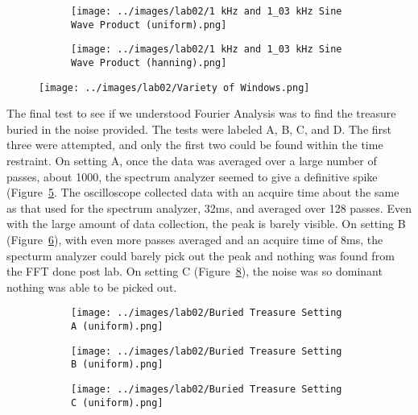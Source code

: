 \documentclass[12pt]{article}
\begin{document}
\begin{figure}[!ht]
    \centering
    \begin{subfigure}[h]{\textwidth}
    \texttt{[image: ../images/lab02/1 kHz and 1\_03 kHz Sine Wave Product (uniform).png]}
    \caption{}
    \label{fig:sine product}
    \end{subfigure}
    \begin{subfigure}[h]{\textwidth}
    \texttt{[image: ../images/lab02/1 kHz and 1\_03 kHz Sine Wave Product (hanning).png]}
    \caption{}
    \label{fig:sine product}
    \end{subfigure}
\end{figure} %

\begin{figure}
\centering
    \texttt{[image: ../images/lab02/Variety of Windows.png]}
    \caption{}
    \label{fig:various windows}
\end{figure} %

The final test to see if we understood Fourier Analysis was to find the treasure buried in the noise provided. The tests were labeled A, B, C, and D. The first three were attempted, and only the first two could be found within the time restraint. On setting A, once the data was averaged over a large number of passes, about 1000, the spectrum analyzer seemed to give a definitive spike (Figure~\ref{fig:buried A}. The oscilloscope collected data with an acquire time about the same as that used for the spectrum analyzer, 32ms, and averaged over 128 passes. Even with the large amount of data collection, the peak is barely visible. On setting B (Figure~\ref{fig:buried B}), with even more passes averaged and an acquire time of 8ms, the specturm analyzer could barely pick out the peak and nothing was found from the FFT done post lab. On setting C (Figure~\ref{fig:buried C}), the noise was so dominant nothing was able to be picked out. 

\begin{figure}[!ht]
    \centering
    \begin{subfigure}[h]{\textwidth}
    \texttt{[image: ../images/lab02/Buried Treasure Setting A (uniform).png]}
    \caption{}
    \label{fig:buried A}
    \end{subfigure}
    \begin{subfigure}[h]{\textwidth}
    \texttt{[image: ../images/lab02/Buried Treasure Setting B (uniform).png]}
    \caption{}
    \label{fig:buried B}
    \end{subfigure}
    \begin{subfigure}[h]{\textwidth}
    \texttt{[image: ../images/lab02/Buried Treasure Setting C (uniform).png]}
    \caption{}
    \label{fig:buried C}
    \end{subfigure}
\end{figure} %
\end{document}
